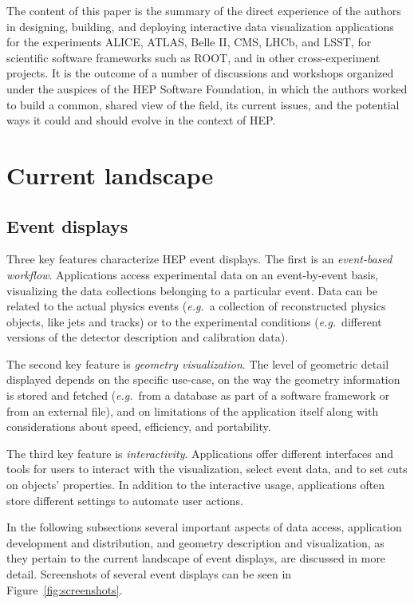 \documentclass[12pt,a4paper]{article}
\begin{document}
The content of this paper is the summary of the direct experience of the authors in designing, building, and deploying
interactive data visualization applications for the experiments ALICE, ATLAS, Belle II, CMS, LHCb, and LSST, for scientific
software frameworks such as ROOT, and in other cross-experiment projects. It is the outcome of a number of discussions and workshops organized
under the auspices of the HEP Software Foundation,
in which the authors worked to build a common, shared view of the field, its current issues, and the potential ways it could and should evolve
in the context of HEP.

\hypertarget{current-landscape}{%
\section{Current landscape}\label{current-landscape}}

\hypertarget{event-displays}{%
\subsection{Event displays}\label{event-displays}}

Three key features characterize HEP event displays. The first is an \emph{event-based workflow}. Applications access
experimental data on an event-by-event basis,
visualizing the data collections belonging to a particular event. Data can be related to the
actual physics events ({\it e.g.}\ a collection of reconstructed physics objects, like jets and tracks) or to the experimental
conditions ({\it e.g.}\ different versions of the detector description and calibration data).

The second key feature is \emph{geometry visualization}.
The level of geometric detail displayed depends on the specific use-case, on the way the geometry information is stored and
fetched ({\it e.g.}\ from a database as part of a software framework or from an external file), and on
limitations of the application itself along with
considerations about speed, efficiency, and portability.

The third key feature is \emph{interactivity}. Applications offer different interfaces and tools for users to interact
with the visualization, select event data, and to set cuts on objects' properties.
In addition to the interactive usage, applications often store different settings to automate user actions.

In the following subsections several important aspects of data access, application development and distribution, and geometry description
and visualization, as they pertain to the current landscape of event displays, are discussed in more detail. Screenshots of several
event displays can be seen in Figure~\ref{fig:screenshots}.
\end{document}
